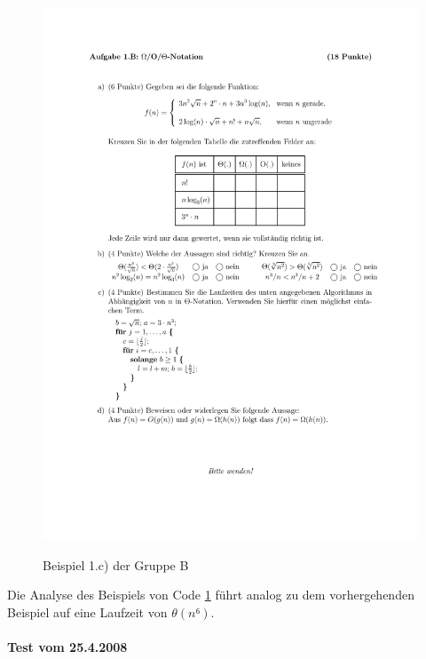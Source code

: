 \documentclass[a4paper, 12pt]{article}
\begin{document}
\begin{figure}[H]
	\caption{Beispiel 1.c) der Gruppe B}
	\vskip 0.2cm
	\centering
	\includegraphics{Figures/Test_2007-11-16_1Bc}
	\label{figure:Test_2007-11-16_1Bc}
\end{figure}

Die Analyse des Beispiels von Code \ref{figure:Test_2007-11-16_1Bc} führt analog zu dem vorhergehenden Beispiel auf eine Laufzeit von $θ\left(n⁶\right)$.

\paragraph{Test vom 25.4.2008}~\\
\end{document}
